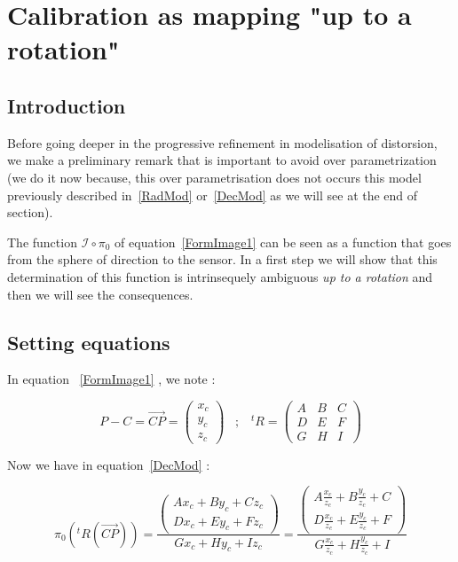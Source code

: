 \section{Calibration as mapping "up to a rotation"}
\label{UpToARot}

\subsection{Introduction}

Before going deeper in the progressive refinement in modelisation of
distorsion, we  make a preliminary remark that is important
to avoid over parametrization (we do it now because, this over parametrisation
does not occurs this model previously described in~\ref{RadMod} or~\ref{DecMod} 
as we will see at the end of section).


The function $\mathcal{I} \circ \pi_0$  of equation~\ref{FormImage1} can be seen as a function that
goes from the sphere of direction to the sensor.  In a first
step we will show that this determination of this function is intrinsequely ambiguous
\emph{up to a rotation} and then we will see the consequences.


\subsection{Setting equations}

In equation ~\ref{FormImage1} , we note :

\begin{equation}
	P-C =  \overrightarrow{CP}  = \begin{pmatrix} x_c \\ y_c \\ z_c \end{pmatrix} 
\;\;\;  ;  \;\;\;
        ^t R =  \begin{pmatrix}  A & B & C \\ D & E & F \\ G & H & I \end{pmatrix} 
\end{equation}

Now we have in equation~\ref{DecMod} :

\begin{equation}
	\pi_0(^t R(\overrightarrow{CP})) 
	=  \frac{\begin{pmatrix} Ax_c+By_c+Cz_c \\ Dx_c+Ey_c+Fz_c  \end{pmatrix}}{Gx_c+Hy_c+Iz_c}
		=  \frac{\begin{pmatrix} A\frac{x_c}{z_c}+B\frac{y_c}{z_c}+C \\  D\frac{x_c}{z_c}+E\frac{y_c}{z_c}+F  \end{pmatrix}}
			{G\frac{x_c}{z_c}+H\frac{y_c}{z_c}+I}
\end{equation}

